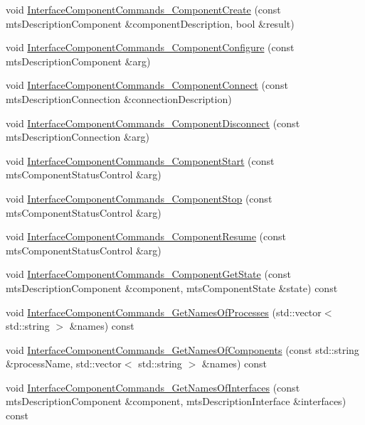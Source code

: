 \begin{DoxyCompactItemize}
void \hyperlink{classmts_manager_component_client_a806767b2de84dc3f321cf94bdabdf155}{Interface\+Component\+Commands\+\_\+\+Component\+Create} (const mts\+Description\+Component \&component\+Description, bool \&result)
\item 
void \hyperlink{classmts_manager_component_client_a01f07ac088b85aafbbafadd7e1226134}{Interface\+Component\+Commands\+\_\+\+Component\+Configure} (const mts\+Description\+Component \&arg)
\item 
void \hyperlink{classmts_manager_component_client_a127c76c11be57fc84ff4eb7f2558248d}{Interface\+Component\+Commands\+\_\+\+Component\+Connect} (const mts\+Description\+Connection \&connection\+Description)
\item 
void \hyperlink{classmts_manager_component_client_adf9f69121fc903ff25375b1c788cf133}{Interface\+Component\+Commands\+\_\+\+Component\+Disconnect} (const mts\+Description\+Connection \&arg)
\item 
void \hyperlink{classmts_manager_component_client_a3dba91132c57038c7fab0aed721a2332}{Interface\+Component\+Commands\+\_\+\+Component\+Start} (const mts\+Component\+Status\+Control \&arg)
\item 
void \hyperlink{classmts_manager_component_client_aea7d360a980850be7240946beeb308af}{Interface\+Component\+Commands\+\_\+\+Component\+Stop} (const mts\+Component\+Status\+Control \&arg)
\item 
void \hyperlink{classmts_manager_component_client_ad1aba071e3395654ecb8b15ea3894296}{Interface\+Component\+Commands\+\_\+\+Component\+Resume} (const mts\+Component\+Status\+Control \&arg)
\item 
void \hyperlink{classmts_manager_component_client_a71563477c115e8e5e09fd70e989a60db}{Interface\+Component\+Commands\+\_\+\+Component\+Get\+State} (const mts\+Description\+Component \&component, mts\+Component\+State \&state) const 
\item 
void \hyperlink{classmts_manager_component_client_a9f58399384c52a9fa6c05a3533467a4c}{Interface\+Component\+Commands\+\_\+\+Get\+Names\+Of\+Processes} (std\+::vector$<$ std\+::string $>$ \&names) const 
\item 
void \hyperlink{classmts_manager_component_client_adb5405af61fdc8d9689cf63bb6090a34}{Interface\+Component\+Commands\+\_\+\+Get\+Names\+Of\+Components} (const std\+::string \&process\+Name, std\+::vector$<$ std\+::string $>$ \&names) const 
\item 
void \hyperlink{classmts_manager_component_client_a9f3d21786d18f9c41edb3432bc9326cb}{Interface\+Component\+Commands\+\_\+\+Get\+Names\+Of\+Interfaces} (const mts\+Description\+Component \&component, mts\+Description\+Interface \&interfaces) const 

\end{DoxyCompactItemize}
